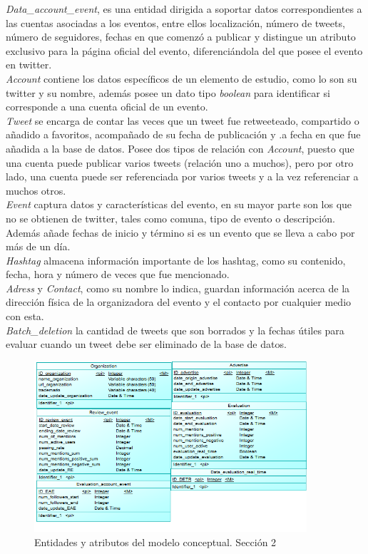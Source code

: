 \documentclass{memoria}
\begin{document}
\textit{Data\_account\_event}, es una entidad dirigida a soportar datos correspondientes a las cuentas asociadas a los eventos, entre ellos localización, número de tweets, número de seguidores, fechas en que comenzó a publicar y distingue un atributo exclusivo para la página oficial del evento, diferenciándola del que posee el evento en twitter.\\
\textit{Account} contiene los datos específicos de un elemento de estudio, como lo son su twitter y su nombre, además posee un dato tipo \textit{boolean} para identificar si corresponde a una cuenta oficial de un evento.\\
\textit{Tweet} se encarga de contar las veces que un tweet fue retweeteado, compartido o añadido a favoritos, acompañado de su fecha de publicación y .a fecha en que fue añadida a la base de datos. Posee dos tipos de relación con \textit{Account}, puesto que una cuenta puede publicar varios tweets (relación uno a muchos), pero por otro lado, una cuenta puede ser referenciada por varios tweets y a la vez referenciar a muchos otros.\\
\textit{Event} captura datos y características del evento, en su mayor parte son los que no se obtienen de twitter, tales como comuna, tipo de evento o descripción. Además añade fechas de inicio y término si es un evento que se lleva a cabo por más de un día.\\
\textit{Hashtag} almacena información importante de los hashtag, como su contenido, fecha, hora y número de veces que fue mencionado.\\
\textit{Adress} y \textit{Contact}, como su nombre lo indica, guardan información acerca de la dirección física de la organizadora del evento y el contacto por cualquier medio con esta.\\
\textit{Batch\_deletion} la cantidad de tweets que son borrados y la fechas útiles para evaluar cuando un tweet debe ser eliminado de la base de datos.
\newpage

\begin{figure}[!ht]
\begin{center}
\includegraphics[width=0.9\textwidth]{img/tablaconceptual3.png}
\caption{Entidades y atributos del modelo conceptual. Sección 2}
\end{center}
\end{figure}
\end{document}
